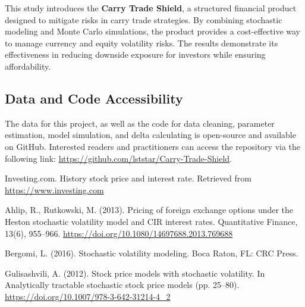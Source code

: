 \documentclass[a4paper, twocolumn]{article}
\begin{document}
This study introduces the \textbf{Carry Trade Shield}, a structured financial product designed to mitigate risks in carry trade strategies. By combining stochastic modeling and Monte Carlo simulations, the product provides a cost-effective way to manage currency and equity volatility risks. The results demonstrate its effectiveness in reducing downside exposure for investors while ensuring affordability.

\subsection{Data and Code Accessibility}

The data for this project, as well as the code for data cleaning, parameter estimation, model simulation, and delta calculating is open-source and available on GitHub. Interested readers and practitioners can access the repository via the following link: \href{https://github.com/lststar/Carry-Trade-Shield}{https://github.com/lststar/Carry-Trade-Shield}.

\begin{thebibliography}{4}

Investing.com. History stock price and interest rate. Retrieved from \href{https://www.investing.com/}{https://www.investing.com}

Ahlip, R., Rutkowski, M. (2013). Pricing of foreign exchange options under the Heston stochastic volatility model and CIR interest rates. Quantitative Finance, 13(6), 955–966.
\href{https://doi.org/10.1080/14697688.2013.769688}{https://doi.org/10.1080/14697688.2013.769688}

Bergomi, L. (2016). Stochastic volatility modeling. Boca Raton, FL: CRC Press.

Gulisashvili, A. (2012). Stock price models with stochastic volatility. In Analytically tractable stochastic stock price models (pp. 25–80).
\href{https://doi.org/10.1007/978-3-642-31214-4_2}{https://doi.org/10.1007/978-3-642-31214-4\_2}


\end{thebibliography}
\end{document}
